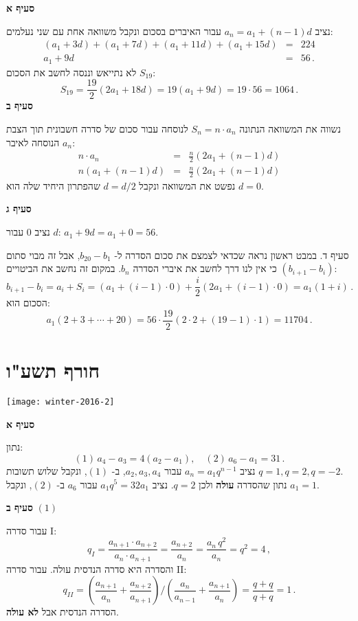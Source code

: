 \textbf{סעיף א}

נציב
$a_n=a_1+(n-1)d$
עבור האיברים בסכום ונקבל משוואה אחת עם שני נעלמים:
\begin{eqnarray*}
(a_1+3d)+(a_1+7d)+(a_1+11d)+(a_1+15d)&=&224\\
a_1+9d&=&56\,.
\end{eqnarray*}
לא נתייאש וננסה לחשב את הסכום
$S_{19}$:
\[
S_{19}=\frac{19}{2}(2a_1+18d) = 19(a_1+9d)=19\cdot 56 = 1064\,.
\]
\textbf{סעיף ב}

נשווה את המשוואה הנתונה
$S_n=n\cdot a_n$
לנוסחה עבור סכום של סדרה חשבונית תוך הצבת הנוסחה לאיבר
$a_n$:
\begin{eqnarray*}
n\cdot a_n &=& \frac{n}{2}(2a_1+(n-1)d)\\
n(a_1+(n-1)d) &=&\frac{n}{2}(2a_1+(n-1)d)
\end{eqnarray*}
נפשט את המשוואה ונקבל 
$d=d/2$
שהפתרון היחיד שלה הוא
$d=0$.

\textbf{סעיף ג}

נציב
$0$
עבור 
$d$:
$a_1+9d=a_1+0=56$.

סעיף ד. במבט ראשון נראה שכדאי לצמצם את סכום הסדרה  ל-%
$b_{20}-b_1$,
אבל זה מבוי סתום כי אין לנו דרך לחשב את איברי הסדרה
$b_n$.
במקום זה נחשב את הביטויים
$(b_{i+1}-b_i)$:
\[
b_{i+1}-b_i=a_i+S_i=(a_1+(i-1)\cdot 0)+\frac{i}{2}(2a_1+(i-1)\cdot 0)=a_1(1+i)\,.
\]
הסכום הוא:
\[
a_1(2+3+\cdots+20)=56\cdot\frac{19}{2}(2\cdot 2 + (19-1)\cdot 1)=11704\,.
\]

\np
\section{חורף תשע"ו}

\begin{center}
\texttt{[image: winter-2016-2]}
\end{center}

\vspace{-3ex}

\textbf{סעיף א}

נתון:
\[
(1)\, a_4-a_3 = 4 (a_2-a_1),\quad (2)\, a_6 - a_1 = 31\,.
\]
נציב
$a_n=a_1q^{n-1}$ 
עבור
$a_2, a_3, a_4$,
ב-%
$(1)$,
ונקבל שלוש תשובות
$q=1,q=2,q=-2$.\\
נתון שהסדרה 
\textbf{עולה}
ולכן
$q=2$.
נציב 
$a_1q^5=32 a_1$
עבור
$a_6$
ב-%
$(2)$,
ונקבל
$a_1=1$.

\textbf{סעיף ב} 
$(1)$

עבור סדרה I:
\[
q_I=\frac{a_{n+1}\cdot a_{n+2}}{a_n\cdot a_{n+1}}=\frac{a_{n+2}}{a_n}=\frac{a_n\,q^2}{a_n}=q^2=4\,,
\]
והסדרה היא סדרה הנדסית עולה. עבור סדרה II:
\[
q_{II}=\left(\frac{a_{n+1}}{a_n} + \frac{a_{n+2}}{a_{n+1}}\right) / \left(\frac{a_{n}}{a_{n-1}} + \frac{a_{n+1}}{a_{n}}\right)=\frac{q+q}{q+q}=1\,.
\]
הסדרה הנדסית אבל
\textbf{לא עולה}.

